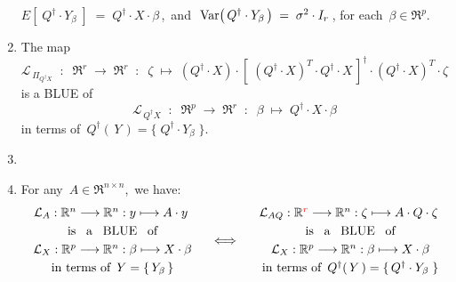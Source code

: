 \begin{theorem}
\begin{enumerate}
	$E\!\left[\;Q^{\dagger} \cdot Y_{\beta}\;\right] \; = \; Q^{\dagger} \cdot X \cdot \beta$\,,
	\,and\,
	\,$\textnormal{Var}\!\left(\,Q^{\dagger} \cdot Y_{\beta}\,\right) \; = \; \sigma^{2} \cdot I_{r}$\,,
	for each \,$\beta \in \Re^{p}$.
\item
	The map
	\begin{equation*}
	\mathcal{L}_{\,\Pi_{Q^{\dagger}X}}
	\;\; : \;\; \Re^{r} \; \longrightarrow \; \Re^{r}
	\;\; : \;\; \zeta \; \longmapsto \;
		(Q^{\dagger} \cdot X)
		\cdot
		\left[\;(Q^{\dagger} \cdot X)^{T} \cdot Q^{\dagger} \cdot X \,\right]^{\dagger}
		\cdot
		(Q^{\dagger} \cdot X)^{T} \cdot \zeta
	\end{equation*}
	is a BLUE of
	\begin{equation*}
	\mathcal{L}_{\,Q^{\dagger}X}
	\;\; : \;\; \Re^{p} \; \longrightarrow \; \Re^{r}
	\;\; : \;\; \beta \; \longmapsto \; Q^{\dagger} \cdot X \cdot \beta
	\end{equation*}
	in terms of
	\,$Q^{\dagger}(\,Y\,) = \{\;Q^{\dagger} \cdot Y_{\beta}\;\}$.
\item

\item
	For any \,$A \in \Re^{n \times n}$,\, we have:
	\begin{equation*}
	\begin{array}{c}
		\mathcal{L}_{A} : \Re^{n} \longrightarrow \Re^{n} : y \longmapsto A \cdot y
		\\{\color{white}\overset{.}{\vert}}
		\textnormal{is \, a \, BLUE \, of}
		\\{\color{white}\overset{.}{\vert}}
		\mathcal{L}_{X} : \Re^{p} \longrightarrow \Re^{n} : \beta \longmapsto X \cdot \beta
		\\{\color{white}\overset{.}{\vert}}
		\textnormal{in terms of \,$Y = \{\,Y_{\beta}\,\}$}
		\end{array}
	\quad\Longleftrightarrow\quad
		\begin{array}{c}
		\mathcal{L}_{AQ} : \Re^{\color{red}r} \longrightarrow \Re^{n} : \zeta \longmapsto A \cdot Q \cdot \zeta
		\\{\color{white}\overset{.}{\vert}}
		\textnormal{is \, a \, BLUE \, of}
		\\{\color{white}\overset{.}{\vert}}
		\mathcal{L}_{X} : \Re^{p} \longrightarrow \Re^{n} : \beta \longmapsto X \cdot \beta
		\\{\color{white}\overset{.}{\vert}}
		\textnormal{in terms of \,$Q^{\dagger}(\,Y\,) = \{\,Q^{\dagger} \cdot Y_{\beta}\;\}$}
	\end{array}
	\end{equation*}
\end{enumerate}
\end{theorem}
